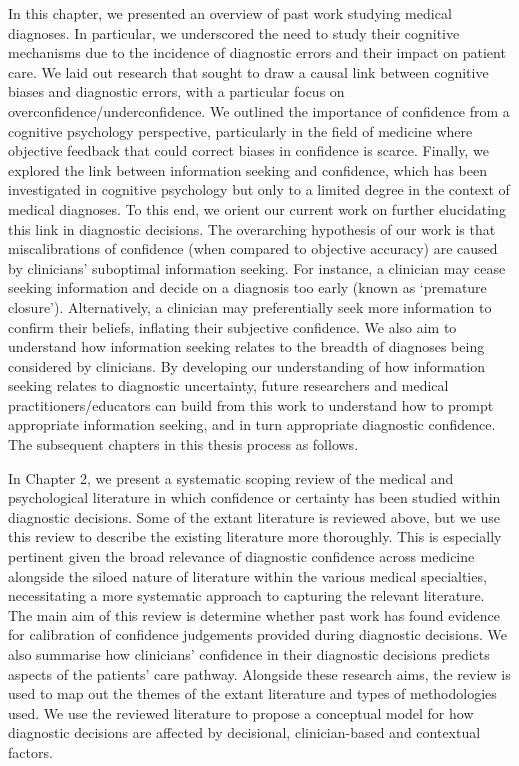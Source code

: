 \documentclass[a4paper, nobind]{templates/ociamthesis}
\begin{document}
In this chapter, we presented an overview of past work studying medical diagnoses. In particular, we underscored the need to study their cognitive mechanisms due to the incidence of diagnostic errors and their impact on patient care. We laid out research that sought to draw a causal link between cognitive biases and diagnostic errors, with a particular focus on overconfidence/underconfidence. We outlined the importance of confidence from a cognitive psychology perspective, particularly in the field of medicine where objective feedback that could correct biases in confidence is scarce. Finally, we explored the link between information seeking and confidence, which has been investigated in cognitive psychology but only to a limited degree in the context of medical diagnoses. To this end, we orient our current work on further elucidating this link in diagnostic decisions. The overarching hypothesis of our work is that miscalibrations of confidence (when compared to objective accuracy) are caused by clinicians' suboptimal information seeking. For instance, a clinician may cease seeking information and decide on a diagnosis too early (known as `premature closure'). Alternatively, a clinician may preferentially seek more information to confirm their beliefs, inflating their subjective confidence. We also aim to understand how information seeking relates to the breadth of diagnoses being considered by clinicians. By developing our understanding of how information seeking relates to diagnostic uncertainty, future researchers and medical practitioners/educators can build from this work to understand how to prompt appropriate information seeking, and in turn appropriate diagnostic confidence. The subsequent chapters in this thesis process as follows.

\hfill\break
In Chapter 2, we present a systematic scoping review of the medical and psychological literature in which confidence or certainty has been studied within diagnostic decisions. Some of the extant literature is reviewed above, but we use this review to describe the existing literature more thoroughly. This is especially pertinent given the broad relevance of diagnostic confidence across medicine alongside the siloed nature of literature within the various medical specialties, necessitating a more systematic approach to capturing the relevant literature. The main aim of this review is determine whether past work has found evidence for calibration of confidence judgements provided during diagnostic decisions. We also summarise how clinicians' confidence in their diagnostic decisions predicts aspects of the patients' care pathway. Alongside these research aims, the review is used to map out the themes of the extant literature and types of methodologies used. We use the reviewed literature to propose a conceptual model for how diagnostic decisions are affected by decisional, clinician-based and contextual factors.
\end{document}
